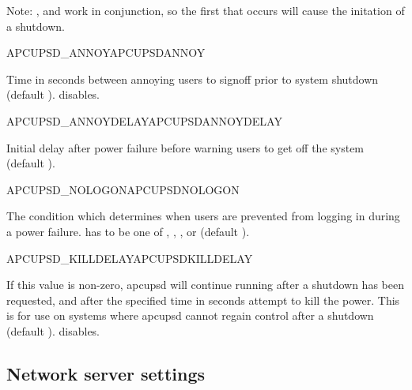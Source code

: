 \begin {description}
  Note: ,  and 
   work in conjunction, so
  the first that occurs will cause the initation of a shutdown.


 {APCUPSD\_ANNOY}{APCUPSDANNOY}
  
  Time in seconds between annoying users to signoff prior to
  system shutdown (default ).  disables. 


 {APCUPSD\_ANNOYDELAY}{APCUPSDANNOYDELAY}
 
  Initial delay after power failure before warning users to get
  off the system (default ).


 {APCUPSD\_NOLOGON}{APCUPSDNOLOGON}
 
  The condition which determines when users are prevented from
  logging in during a power failure.
   has to be one of 
  , , ,  or
   (default ).


 {APCUPSD\_KILLDELAY}{APCUPSDKILLDELAY}
 
  If this value is non-zero, apcupsd will continue running after a
  shutdown has been requested, and after the specified time in
  seconds attempt to kill the power. This is for use on systems
  where apcupsd cannot regain control after a shutdown (default ).
   disables.

\end {description}

\subsection{Network server settings}

